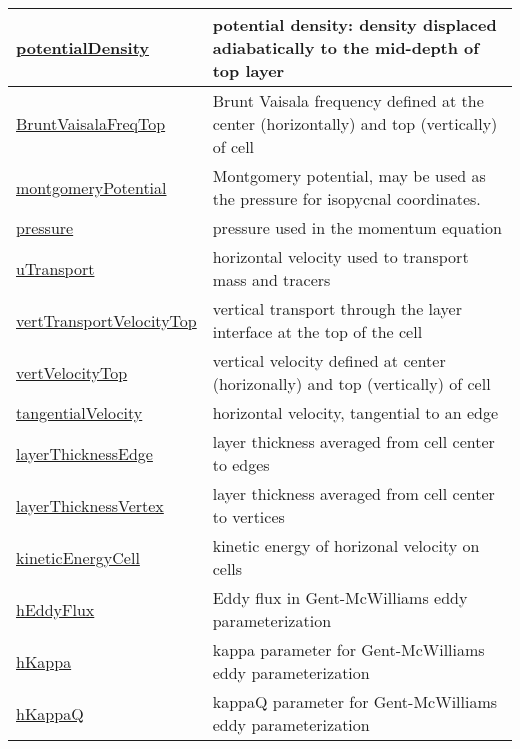 {\begin{center}
\begin{longtable}{| p{2.0in} | p{4.0in} |}
	\hline
	\hyperref[subsec:var_sec_diagnostics_potentialDensity]{potentialDensity} & potential density: density displaced adiabatically to the mid-depth of top layer \\
	\hline
	\hyperref[subsec:var_sec_diagnostics_BruntVaisalaFreqTop]{BruntVaisalaFreqTop} & Brunt Vaisala frequency defined at the center (horizontally) and top (vertically) of cell \\
	\hline
	\hyperref[subsec:var_sec_diagnostics_montgomeryPotential]{montgomeryPotential} & Montgomery potential, may be used as the pressure for isopycnal coordinates. \\
	\hline
	\hyperref[subsec:var_sec_diagnostics_pressure]{pressure} & pressure used in the momentum equation \\
	\hline
	\hyperref[subsec:var_sec_diagnostics_uTransport]{uTransport} & horizontal velocity used to transport mass and tracers \\
	\hline
	\hyperref[subsec:var_sec_diagnostics_vertTransportVelocityTop]{vertTransportVelocityTop} & vertical transport through the layer interface at the top of the cell \\
	\hline
	\hyperref[subsec:var_sec_diagnostics_vertVelocityTop]{vertVelocityTop} & vertical velocity defined at center (horizonally) and top (vertically) of cell \\
	\hline
	\hyperref[subsec:var_sec_diagnostics_tangentialVelocity]{tangentialVelocity} & horizontal velocity, tangential to an edge \\
	\hline
	\hyperref[subsec:var_sec_diagnostics_layerThicknessEdge]{layerThicknessEdge} & layer thickness averaged from cell center to edges \\
	\hline
	\hyperref[subsec:var_sec_diagnostics_layerThicknessVertex]{layerThicknessVertex} & layer thickness averaged from cell center to vertices \\
	\hline
	\hyperref[subsec:var_sec_diagnostics_kineticEnergyCell]{kineticEnergyCell} & kinetic energy of horizonal velocity on cells \\
	\hline
	\hyperref[subsec:var_sec_diagnostics_hEddyFlux]{hEddyFlux} & Eddy flux in Gent-McWilliams eddy parameterization \\
	\hline
	\hyperref[subsec:var_sec_diagnostics_hKappa]{hKappa} & kappa parameter for Gent-McWilliams eddy parameterization \\
	\hline
	\hyperref[subsec:var_sec_diagnostics_hKappaQ]{hKappaQ} & kappaQ parameter for Gent-McWilliams eddy parameterization \\
	\hline

\end{longtable}
\end{center}}

